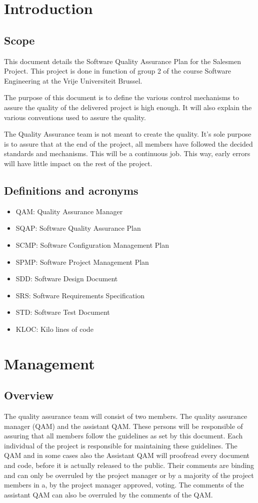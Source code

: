 \documentclass[salesmen, twoside]{../../../templates/latex/2009/softproj}
\begin{document}
\begin{projdoc}
\chapter{Introduction}
\section{Scope}
This document details the Software Quality Assurance Plan for the Salesmen Project. This project is done in function of group 2 of the course Software Engineering at the Vrije Universiteit Brussel.

The purpose of this document is to define the various control mechanisms to assure the quality of the delivered project is high enough. It will also explain the various conventions used to assure the quality.

The Quality Assurance team is not meant to create the quality. It's sole purpose is to assure that at the end of the project, all members have followed the decided standards and mechanisms. This will be a continuous job. This way, early errors will have little impact on the rest of the project.

\section{Definitions and acronyms}
\begin{itemize}
\item QAM: Quality Assurance Manager
\item SQAP: Software Quality Assurance Plan
\item SCMP: Software Configuration Management Plan 
\item SPMP: Software Project Management Plan
\item SDD: Software Design Document
\item SRS: Software Requirements Specification
\item STD: Software Test Document
\item KLOC: Kilo lines of code
\end{itemize}


\chapter{Management}
\section{Overview}
The quality assurance team will consist of two members. The quality assurance manager (QAM) and the assistant QAM. These persons will be responsible of assuring that all members follow the guidelines as set by this document. Each individual of the project is responsible for maintaining these guidelines. The QAM and in some cases also the Assistant QAM will proofread every document and code, before it is actually released to the public. Their comments are binding and can only be overruled by the project manager or by a majority of the project members in a, by the project manager approved, voting. The comments of the assistant QAM can also be overruled by the comments of the QAM.



\end{projdoc}
\end{document}
